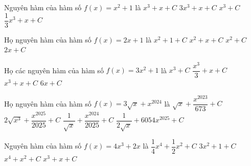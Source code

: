 \begin{ex}%
	Nguyên hàm của hàm  số $f(x)=x^2+1$ là
	\choice 
		{$x^3+x+C$} 
		 {$3x^3+x+C$}
		 {$x^3+C$}
		{\True $\dfrac{1}{3}x^3+x+C$} 
\end{ex}

\begin{ex}%
	 Họ nguyên hàm của hàm số $f(x)=2x+1$ là
	 \choice
		{$x^2+1+C$} 
		{\True $x^2+x+C$} 
		{$x^2  + C$}
		{$2x+C$} 
\end{ex}

\begin{ex}%
	 Họ các nguyên hàm của hàm số $f(x)=3x^2+1$ là
	 \choice
		 {$x^3+C$}
		 {$\dfrac{x^3}{3}+x+C$}
		 {\True $x^3+x+C$}
		 {$6x+C$}
\end{ex}

\begin{ex}%
	Họ nguyên hàm  của hàm số $f(x)=3\sqrt{x}+x^{2024}$ là
	\choice 
		{$\sqrt{x}+\dfrac{x^{2023}}{673}+C$} 
		{\True $2\sqrt{x^3}+\dfrac{x^{2025}}{2025}+C$} 
		 {$\dfrac{1}{\sqrt{x}}+\dfrac{x^{2024}}{2025}+C$}
		 {$\dfrac{1}{2\sqrt{x}}+6054x^{2025}+C$}
\end{ex}

\begin{ex}%
	Nguyên hàm  của hàm số $f(x)=4x^3+2x$ là
	 \choice
		 {$\dfrac{1}{4}x^4+\dfrac{1}{2}x^2+C$}
		 {$3x^2+1+C$}
		{\True  $x^4+x^2+C$}
		 {$x^3+x+C$}
\end{ex}

